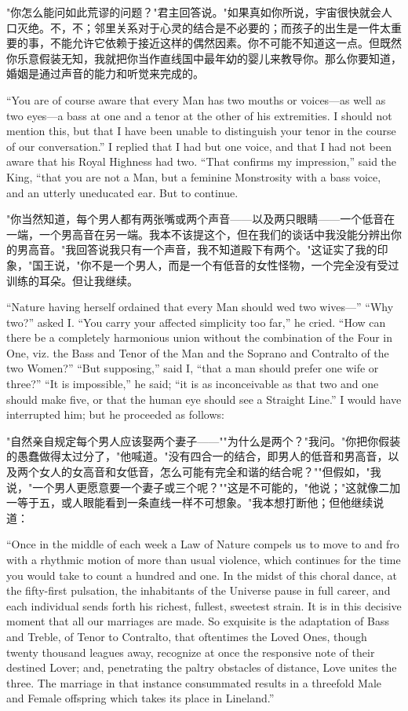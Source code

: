 \documentclass[12pt,UTF8]{ctexbook}
\begin{document}
"你怎么能问如此荒谬的问题？"君主回答说。"如果真如你所说，宇宙很快就会人口灭绝。不，不；邻里关系对于心灵的结合是不必要的；而孩子的出生是一件太重要的事，不能允许它依赖于接近这样的偶然因素。你不可能不知道这一点。但既然你乐意假装无知，我就把你当作直线国中最年幼的婴儿来教导你。那么你要知道，婚姻是通过声音的能力和听觉来完成的。

``You are of course aware that every Man has two mouths or voices---as well as two eyes---a bass at one and a tenor at the other of his extremities. I should not mention this, but that I have been unable to distinguish your tenor in the course of our conversation.'' I replied that I had but one voice, and that I had not been aware that his Royal Highness had two. ``That confirms my impression,'' said the King, ``that you are not a Man, but a feminine Monstrosity with a bass voice, and an utterly uneducated ear. But to continue.

"你当然知道，每个男人都有两张嘴或两个声音——以及两只眼睛——一个低音在一端，一个男高音在另一端。我本不该提这个，但在我们的谈话中我没能分辨出你的男高音。"我回答说我只有一个声音，我不知道殿下有两个。"这证实了我的印象，"国王说，"你不是一个男人，而是一个有低音的女性怪物，一个完全没有受过训练的耳朵。但让我继续。

``Nature having herself ordained that every Man should wed two wives---'' ``Why two?'' asked I. ``You carry your affected simplicity too far,'' he cried. ``How can there be a completely harmonious union without the combination of the Four in One, viz. the Bass and Tenor of the Man and the Soprano and Contralto of the two Women?'' ``But supposing,'' said I, ``that a man should prefer one wife or three?'' ``It is impossible,'' he said; ``it is as inconceivable as that two and one should make five, or that the human eye should see a Straight Line.'' I would have interrupted him; but he proceeded as follows:

"自然亲自规定每个男人应该娶两个妻子——""为什么是两个？"我问。"你把你假装的愚蠢做得太过分了，"他喊道。"没有四合一的结合，即男人的低音和男高音，以及两个女人的女高音和女低音，怎么可能有完全和谐的结合呢？""但假如，"我说，"一个男人更愿意要一个妻子或三个呢？""这是不可能的，"他说；"这就像二加一等于五，或人眼能看到一条直线一样不可想象。"我本想打断他；但他继续说道：

``Once in the middle of each week a Law of Nature compels us to move to and fro with a rhythmic motion of more than usual violence, which continues for the time you would take to count a hundred and one. In the midst of this choral dance, at the fifty-first pulsation, the inhabitants of the Universe pause in full career, and each individual sends forth his richest, fullest, sweetest strain. It is in this decisive moment that all our marriages are made. So exquisite is the adaptation of Bass and Treble, of Tenor to Contralto, that oftentimes the Loved Ones, though twenty thousand leagues away, recognize at once the responsive note of their destined Lover; and, penetrating the paltry obstacles of distance, Love unites the three. The marriage in that instance consummated results in a threefold Male and Female offspring which takes its place in Lineland.''
\end{document}
